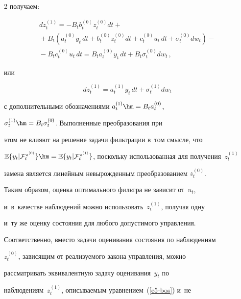 \begin{multicols}{2}
получаем: 


     \begin{multline*}


     dz_t^{(1)} = -B_t b_t^{(0)} z_t^{(0)} dt +{}\\


     {}+ B_t \left( a_t^{(0)} y_t \,dt +b_t^{(0)} z_t^{(0)}dt +c_t^{(0)} u_t\,dt 


+\sigma_t^{(0)}dw_t\right)-{}\\


     {}- B_t c_t^{(0)} u_t \,dt = B_t a_t^{(0)} y_t \,dt +B_t \sigma_t^{(0)} dw_t\,,


     \end{multline*}


      или 


     \begin{equation}


     dz_t^{(1)} =a_t^{(1)}y_t \,dt +\sigma_t^{(1)}dw_t


     \label{e5-bos}


     \end{equation}


с дополнительными обозначениями $a_t^{(1)} \hm= B_t a_t^{(0)}$, 


$\sigma_t^{(1)}\hm= B_t \sigma_t^{(0)}$. Выполненные преобразования при 


этом не влияют на решение задачи фильтрации в~том смысле, что 


$\mathbb{E}\{ y_t\vert \mathcal{F}_t^{z^{(0)}}\} \hm= \mathbb{E} \{ y_t\vert 


\mathcal{F}_t^{z^{(1)}}\}$, поскольку использованная для получения~$z_t^{(1)}$ 


замена является линейным невырожденным преобразованием $z_t^{(0)}$. 


Таким образом, оценка оптимального фильтра не зависит от~$u_t$, 


и~в~качестве наблюдений можно использовать~$z_t^{(1)}$, получая одну 


и~ту же оценку состояния для любого допустимого управ\-ле\-ния. 


Соответственно, вместо задачи оценивания состояния по наблюдениям 


$z_t^{(0)}$, зависящим от реализуемого закона управ\-ле\-ния, можно 


рас\-смат\-ри\-вать эквивалентную задачу оценивания~$y_t$ по 


наблюдениям~$z_t^{(1)}$, опи\-сы\-ва\-емым урав\-не\-ни\-ем~(\ref{e5-bos}) и~не 



\end{multicols}
